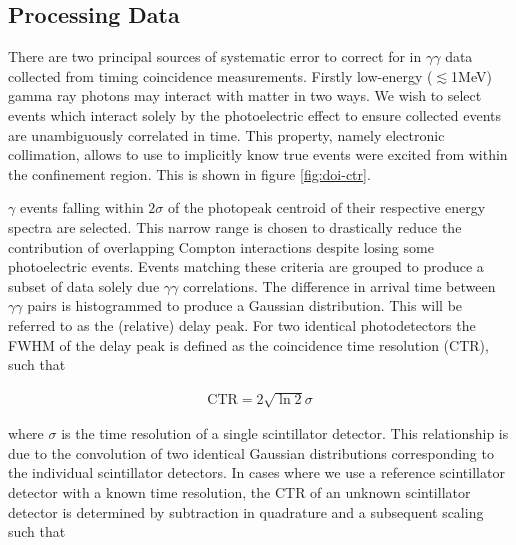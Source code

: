 \subsection{Processing Data}
There are two principal sources of systematic error to correct for in $\gamma\gamma$ data collected from timing coincidence measurements. Firstly low-energy ($\lesssim$1MeV) gamma ray photons may interact with matter in two ways. We wish to select events which interact solely by the photoelectric effect to ensure collected events are unambiguously correlated in time. This property, namely electronic collimation, allows to use to implicitly know true events were excited from within the confinement region. This is shown in figure \ref{fig:doi-ctr}.

$\gamma$ events falling within $2\sigma$ of the photopeak centroid of their respective energy spectra are selected. This narrow range is chosen to drastically reduce the contribution of overlapping Compton interactions despite losing some photoelectric events. Events matching these criteria are grouped to produce a subset of data solely due $\gamma\gamma$ correlations. The difference in arrival time between $\gamma\gamma$ pairs is histogrammed to produce a Gaussian distribution. This will be referred to as the (relative) delay peak. For two identical photodetectors the FWHM of the delay peak is defined as the coincidence time resolution (CTR), such that

\begin{align}
\text{CTR} = 2\sqrt{\ln{2}}\sigma
\end{align}

where $\sigma$ is the time resolution of a single scintillator detector. This relationship is due to the convolution of two identical Gaussian distributions corresponding to the individual scintillator detectors. In cases where we use a reference scintillator detector with a known time resolution, the CTR of an unknown scintillator detector is determined by subtraction in quadrature and a subsequent scaling such that

